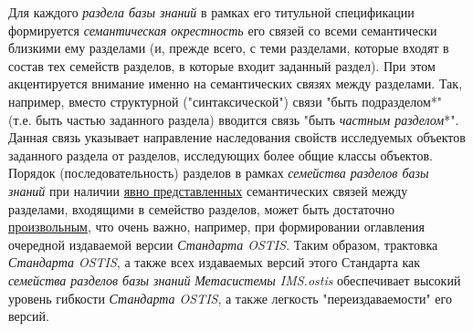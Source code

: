 \begin{SCn}
{Для каждого \textit{раздела базы знаний} в рамках его титульной спецификации формируется \textit{семантическая окрестность} его связей со всеми семантически близкими ему разделами (и, прежде всего, с теми разделами, которые входят в состав тех семейств разделов, в которые входит заданный раздел). При этом акцентируется внимание именно на семантических связях между разделами. Так, например, вместо структурной ("синтаксической"{}) связи "быть подразделом*"{} (т.е. быть частью заданного раздела) вводится связь "быть \textit{частным разделом}*"{}. \\
Данная связь указывает направление наследования свойств исследуемых объектов заданного раздела от разделов, исследующих более общие классы объектов.
Порядок (последовательность) разделов в рамках \textit{семейства разделов базы знаний} при наличии \uline{явно представленных} семантических связей между разделами, входящими в семейство разделов, может быть достаточно \uline{произвольным}, что очень важно, например, при формировании оглавления очередной издаваемой версии \textit{Стандарта OSTIS}. Таким образом, трактовка \textit{Стандарта OSTIS}, а также всех издаваемых версий этого Стандарта как \textit{семейства разделов базы знаний} \scnbigskip \textit{Метасистемы IMS.ostis} обеспечивает высокий уровень гибкости \textit{Стандарта OSTIS}, а также легкость "переиздаваемости"{} его версий.}



\end{SCn}
